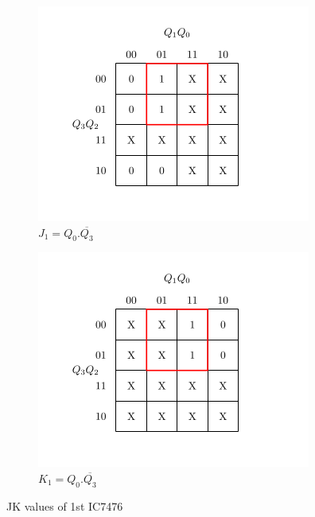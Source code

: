 \documentclass[a4paper,12pt]{article}
\begin{document}
\begin{figure}[H]
    \vspace{0.5cm}

    \begin{subfigure}[b]{0.45\textwidth}
        \centering
        \includegraphics[width=\linewidth]{inc/ij1.png}
        \caption{$J_1=Q_0.\overline{Q_3}$}
    \end{subfigure}
    \hfill
    \begin{subfigure}[b]{0.45\textwidth}
        \centering
        \includegraphics[width=\linewidth]{inc/ik1.png}
        \caption{$K_1=Q_0.\overline{Q_3}$}
    \end{subfigure}

    \caption{JK values of 1st IC7476}
\end{figure}
\end{document}
